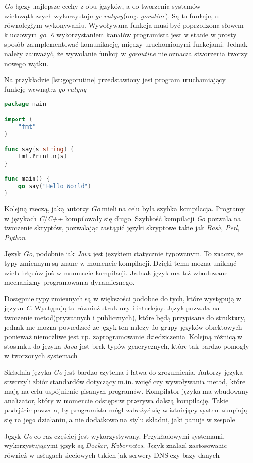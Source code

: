\textsl{Go} łączy najlepsze cechy z obu języków, a do tworzenia systemów wielowątkowych wykorzystuje \textsl{go rutyny}(ang. \textsl{gorutine})\cite{gophrasebook}. Są to funkcje, o równoległym wykonywaniu. Wywoływana funkcja musi być poprzedzona słowem kluczowym \textsl{go}. Z wykorzystaniem kanałów programista jest w stanie w prosty sposób zaimplementować komunikację, między uruchomionymi funkcjami. Jednak należy zauważyć, że wywołanie funkcji w \textsl{goroutine} nie oznacza stworzenia tworzy nowego wątku. 

Na przykładzie \ref{lst:gogorutine} przedstawiony jest program uruchamiający funkcję wewnątrz \textsl{go rutyny}
\begin{lstlisting}[language=Go, caption={Przykładowy program w Go uruchamiający funkcję w oddzielnym wątku}, label={lst:gogorutine}]
package main

import (
	"fmt"
)

func say(s string) {
	fmt.Println(s)
}

func main() {
	go say("Hello World")
}
\end{lstlisting}



Kolejną rzeczą, jaką autorzy \textsl{Go} mieli na celu była szybka kompilacja. Programy w językach \textsl{C}/\textsl{C++} kompilowały się długo. Szybkość kompilacji \textsl{Go} pozwala na tworzenie skryptów, pozwalając zastąpić języki skryptowe takie jak \textsl{Bash}, \textsl{Perl}, \textsl{Python}

Język \textsl{Go}, podobnie jak \textsl{Java} jest językiem statycznie typowanym. To znaczy, że typy zmiennym są znane w momencie kompilacji. Dzięki temu można uniknąć wielu błędów już w momencie kompilacji. Jednak język ma też wbudowane mechanizmy programowania dynamicznego. 

Dostępnie typy zmiennych są w większości podobne do tych, które występują w języku \textsl{C}. Występują tu również struktury i interfejsy. Język pozwala na tworzenie metod(prywatnych i publicznych), które będą przypisane do struktury, jednak nie można powiedzieć że język ten należy do grupy języków obiektowych ponieważ niemożliwe jest np. zaprogramowanie dziedziczenia. Kolejną różnicą w stosunku do języka \textsl{Java} jest brak typów generycznych, które tak bardzo pomogły w tworzonych systemach
 
Składnia języka \textsl{Go} jest bardzo czytelna i łatwa do zrozumienia. Autorzy języka stworzyli zbiór standardów dotyczący m.in. wcięć czy wywoływania metod, które mają na celu uspójnienie pisanych programów. Kompilator języka ma wbudowany analizator, który w momencie odstępstw przerywa dalszą kompilację. Takie podejście pozwala, by programista mógł wdrożyć się w istniejący system skupiają się na jego działaniu, a nie dodatkowo na stylu składni, jaki panuje w zespole

Język \textsl{Go} co raz częściej jest wykorzystywany. Przykładowymi systemami, wykorzystującymi język są \textsl{Docker}, \textsl{Kubernetes}. Język znalazł zastosowanie również w usługach sieciowych takich jak serwery DNS czy bazy danych.